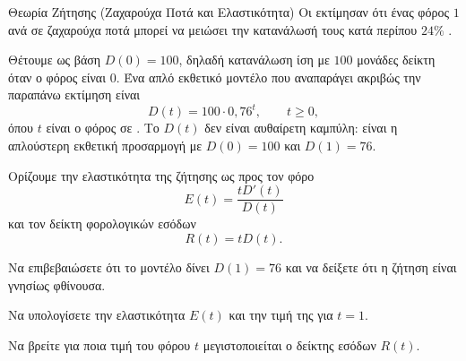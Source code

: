 \begin{problhma}{Θεωρία Ζήτησης (Ζαχαρούχα Ποτά και Ελαστικότητα)}
Οι  εκτίμησαν ότι ένας φόρος
$1$  ανά  σε ζαχαρούχα ποτά μπορεί να μειώσει την
κατανάλωσή τους κατά περίπου $24\%$ \cite{andreyeva2011ssbTax}.

Θέτουμε ως βάση $D(0)=100$, δηλαδή κατανάλωση ίση με $100$ μονάδες
δείκτη όταν ο φόρος είναι $0$. Ένα απλό εκθετικό μοντέλο που
αναπαράγει ακριβώς την παραπάνω εκτίμηση είναι
\[
  D(t)=100\cdot0{,}76^t,\qquad t\geq0,
\]
όπου $t$ είναι ο φόρος σε . Το $D(t)$ δεν είναι αυθαίρετη
καμπύλη: είναι η απλούστερη εκθετική προσαρμογή με
$D(0)=100$ και $D(1)=76$.

Ορίζουμε την ελαστικότητα της ζήτησης ως προς τον φόρο
\[
  E(t)=\frac{tD'(t)}{D(t)}
\]
και τον δείκτη φορολογικών εσόδων
\[
  R(t)=tD(t).
\]
\begin{alist}
\item Να επιβεβαιώσετε ότι το μοντέλο δίνει $D(1)=76$ και να
      δείξετε ότι η ζήτηση είναι γνησίως φθίνουσα.
\item Να υπολογίσετε την ελαστικότητα $E(t)$ και την τιμή της για
      $t=1$.
\item Να βρείτε για ποια τιμή του φόρου $t$ μεγιστοποιείται ο δείκτης
      εσόδων $R(t)$.
\end{alist}

\begin{center}
\end{center}
\end{problhma}
